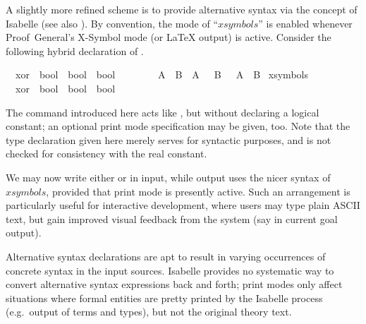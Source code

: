 \begin{isabellebody}
\begin{isamarkuptext}
  \medskip A slightly more refined scheme is to provide alternative
  syntax via the  concept of Isabelle (see also
  \cite{isabelle-ref}).  By convention, the mode of ``$xsymbols$'' is
  enabled whenever Proof~General's X-Symbol mode (or {\LaTeX} output)
  is active.  Consider the following hybrid declaration of .%
\end{isamarkuptext}%
\isamarkuptrue%
\isamarkupfalse%
\isamarkupfalse%
\isanewline
\ \ xor\ {\isacharcolon}{\isacharcolon}\ {\isachardoublequote}bool\ {\isasymRightarrow}\ bool\ {\isasymRightarrow}\ bool{\isachardoublequote}\ \ \ \ {\isacharparenleft}\ {\isachardoublequote}{\isacharbrackleft}{\isacharplus}{\isacharbrackright}{\isasymignore}{\isachardoublequote}\ {}{}{\isacharparenright}\isanewline
\ \ {\isachardoublequote}A\ {\isacharbrackleft}{\isacharplus}{\isacharbrackright}{\isasymignore}\ B\ {\isasymequiv}\ {\isacharparenleft}A\ {\isasymand}\ {\isasymnot}\ B{\isacharparenright}\ {\isasymor}\ {\isacharparenleft}{\isasymnot}\ A\ {\isasymand}\ B{\isacharparenright}{\isachardoublequote}\isanewline
\isanewline
\isamarkupfalse%
\ {\isacharparenleft}xsymbols{\isacharparenright}\isanewline
\ \ xor\ {\isacharcolon}{\isacharcolon}\ {\isachardoublequote}bool\ {\isasymRightarrow}\ bool\ {\isasymRightarrow}\ bool{\isachardoublequote}\ \ \ \ {\isacharparenleft}\ {\isachardoublequote}{\isasymoplus}{\isasymignore}{\isachardoublequote}\ {}{}{\isacharparenright}\isamarkupfalse%
\isamarkupfalse%
%
\begin{isamarkuptext}%
The  command introduced here acts like
  , but without declaring a logical constant; an
  optional print mode specification may be given, too.  Note that the
  type declaration given here merely serves for syntactic purposes,
  and is not checked for consistency with the real constant.

  \medskip We may now write either \isa{{\isacharbrackleft}{\isacharplus}{\isacharbrackright}} or \isa{{\isasymoplus}} in
  input, while output uses the nicer syntax of $xsymbols$, provided
  that print mode is presently active.  Such an arrangement is
  particularly useful for interactive development, where users may
  type plain ASCII text, but gain improved visual feedback from the
  system (say in current goal output).

  \begin{warn}
  Alternative syntax declarations are apt to result in varying
  occurrences of concrete syntax in the input sources.  Isabelle
  provides no systematic way to convert alternative syntax expressions
  back and forth; print modes only affect situations where formal
  entities are pretty printed by the Isabelle process (e.g.\ output of
  terms and types), but not the original theory text.
  \end{warn}


\end{isamarkuptext}
\end{isabellebody}
